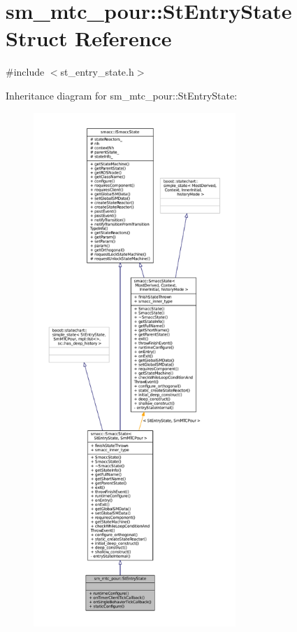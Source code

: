 \hypertarget{structsm__mtc__pour_1_1StEntryState}{}\section{sm\+\_\+mtc\+\_\+pour\+:\+:St\+Entry\+State Struct Reference}
\label{structsm__mtc__pour_1_1StEntryState}


{\ttfamily \#include $<$st\+\_\+entry\+\_\+state.\+h$>$}



Inheritance diagram for sm\+\_\+mtc\+\_\+pour\+:\+:St\+Entry\+State\+:
\nopagebreak
\begin{figure}[H]
\begin{center}
\leavevmode
\includegraphics[height=550pt]{structsm__mtc__pour_1_1StEntryState__inherit__graph}
\end{center}
\end{figure}


